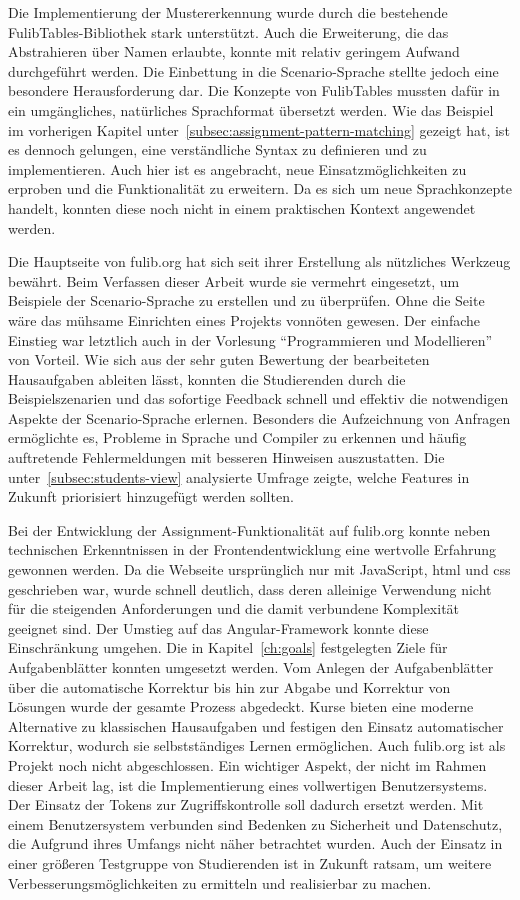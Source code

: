 Die Implementierung der Mustererkennung wurde durch die bestehende FulibTables-Bibliothek stark unterstützt.
Auch die Erweiterung, die das Abstrahieren über Namen erlaubte, konnte mit relativ geringem Aufwand durchgeführt werden.
Die Einbettung in die Scenario-Sprache stellte jedoch eine besondere Herausforderung dar.
Die Konzepte von FulibTables mussten dafür in ein umgängliches, natürliches Sprachformat übersetzt werden.
Wie das Beispiel im vorherigen Kapitel unter~\ref{subsec:assignment-pattern-matching} gezeigt hat, ist es dennoch gelungen, eine verständliche Syntax zu definieren und zu implementieren.
Auch hier ist es angebracht, neue Einsatzmöglichkeiten zu erproben und die Funktionalität zu erweitern.
Da es sich um neue Sprachkonzepte handelt, konnten diese noch nicht in einem praktischen Kontext angewendet werden.

Die Hauptseite von fulib.org hat sich seit ihrer Erstellung als nützliches Werkzeug bewährt.
Beim Verfassen dieser Arbeit wurde sie vermehrt eingesetzt, um Beispiele der Scenario-Sprache zu erstellen und zu überprüfen.
Ohne die Seite wäre das mühsame Einrichten eines Projekts vonnöten gewesen.
Der einfache Einstieg war letztlich auch in der Vorlesung ``Programmieren und Modellieren'' von Vorteil.
Wie sich aus der sehr guten Bewertung der bearbeiteten Hausaufgaben ableiten lässt, konnten die Studierenden durch die Beispielszenarien und das sofortige Feedback schnell und effektiv die notwendigen Aspekte der Scenario-Sprache erlernen.
Besonders die Aufzeichnung von Anfragen ermöglichte es, Probleme in Sprache und Compiler zu erkennen und häufig auftretende Fehlermeldungen mit besseren Hinweisen auszustatten.
Die unter~\ref{subsec:students-view} analysierte Umfrage zeigte, welche Features in Zukunft priorisiert hinzugefügt werden sollten.

Bei der Entwicklung der Assignment-Funktionalität auf fulib.org konnte neben technischen Erkenntnissen in der Frontendentwicklung eine wertvolle Erfahrung gewonnen werden.
Da die Webseite ursprünglich nur mit JavaScript, \ac{html} und \ac{css} geschrieben war, wurde schnell deutlich, dass deren alleinige Verwendung nicht für die steigenden Anforderungen und die damit verbundene Komplexität geeignet sind.
Der Umstieg auf das Angular-Framework konnte diese Einschränkung umgehen.
Die in Kapitel~\ref{ch:goals} festgelegten Ziele für Aufgabenblätter konnten umgesetzt werden.
Vom Anlegen der Aufgabenblätter über die automatische Korrektur bis hin zur Abgabe und Korrektur von Lösungen wurde der gesamte Prozess abgedeckt.
Kurse bieten eine moderne Alternative zu klassischen Hausaufgaben und festigen den Einsatz automatischer Korrektur, wodurch sie selbstständiges Lernen ermöglichen.
Auch fulib.org ist als Projekt noch nicht abgeschlossen.
Ein wichtiger Aspekt, der nicht im Rahmen dieser Arbeit lag, ist die Implementierung eines vollwertigen Benutzersystems.
Der Einsatz der Tokens zur Zugriffskontrolle soll dadurch ersetzt werden.
Mit einem Benutzersystem verbunden sind Bedenken zu Sicherheit und Datenschutz, die Aufgrund ihres Umfangs nicht näher betrachtet wurden.
Auch der Einsatz in einer größeren Testgruppe von Studierenden ist in Zukunft ratsam, um weitere Verbesserungsmöglichkeiten zu ermitteln und realisierbar zu machen.
